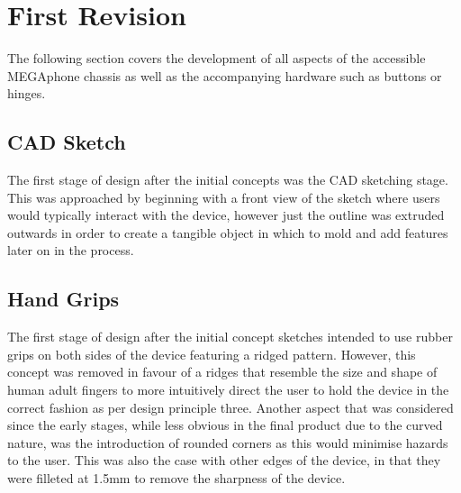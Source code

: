 
\section{First Revision}

The following section covers the development of all aspects of the accessible MEGAphone chassis as well as the accompanying hardware such as buttons or hinges.

\subsection{CAD Sketch}

The first stage of design after the initial concepts was the CAD sketching stage.
This was approached by beginning with a front view of the sketch where users would typically interact with the device, however just the outline was extruded outwards in order to create a tangible object in which to mold and add features later on in the process.

\subsection{Hand Grips}

The first stage of design after the initial concept sketches intended to use rubber grips on both sides of the device featuring a ridged pattern.
However, this concept was removed in favour of a ridges that resemble the size and shape of human adult fingers to more intuitively direct the user to hold the device in the correct fashion as per design principle three.
Another aspect that was considered since the early stages, while less obvious in the final product due to the curved nature, was the introduction of rounded corners as this would minimise hazards to the user.
This was also the case with other edges of the device, in that they were filleted at 1.5mm to remove the sharpness of the device.


